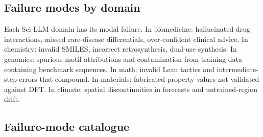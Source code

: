 \subsection{Failure modes by domain}\label{failure-modes-by-domain}

Each Sci-LLM domain has its modal failure. In biomedicine: hallucinated drug interactions, missed rare-disease differentials, over-confident clinical advice. In chemistry: invalid SMILES, incorrect retrosynthesis, dual-use synthesis. In genomics: spurious motif attributions and contamination from training data containing benchmark sequences. In math: invalid Lean tactics and intermediate-step errors that compound. In materials: fabricated property values not validated against DFT. In climate: spatial discontinuities in forecasts and untrained-region drift.

\subsection{Failure-mode catalogue}\label{failure-mode-catalogue}

